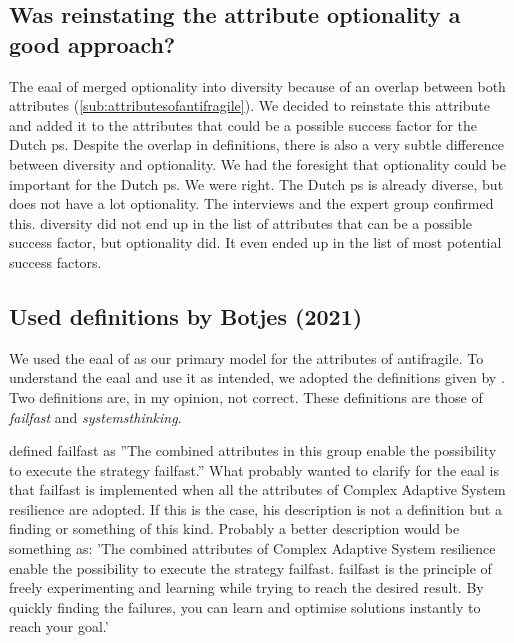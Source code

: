 \subsection{Was reinstating the attribute optionality a good approach?}
\label{sub:reinstating optionality}
The \acrlong{eaal} of \textcite{Botjes2021} merged \gls{optionality} into \gls{diversity} because of an overlap between both \glspl{attribute} (\cref{sub:attributesofantifragile}). We decided to reinstate this attribute and added it to the attributes that could be a possible success factor for the Dutch \gls{ps}. Despite the overlap in definitions, there is also a very subtle difference between \gls{diversity} and \gls{optionality}. We had the foresight that \gls{optionality} could be important for the Dutch \gls{ps}. We were right. The Dutch \gls{ps} is already diverse, but does not have a lot optionality. The interviews and the expert group confirmed this. \Gls{diversity} did not end up in the list of \glspl{attribute} that can be a possible success factor, but \gls{optionality} did. It even ended up in the list of most potential success factors.

\subsection{Used definitions by Botjes (2021)}
\label{sub:systemsthinkingdiscussion}
We used the \acrlong{eaal} of \textcite{Botjes2021} as our primary model for the \glspl{attribute} of \gls{antifragile}. To understand the \acrlong{eaal} and use it as intended, we adopted the definitions given by \textcite{Botjes2021}. Two definitions are, in my opinion, not correct. These definitions are those of \textit{\gls{failfast}} and \textit{\gls{systemsthinking}}.

\Textcite[p.~10]{Botjes2021} defined \gls{failfast} as ''The combined attributes in this group enable the possibility to execute the strategy \gls{failfast}.'' What \textcite{Botjes2021} probably wanted to clarify for the \acrlong{eaal} is that \gls{failfast} is implemented when all the \glspl{attribute} of Complex Adaptive System resilience are adopted. If this is the case, his description is not a definition but a finding or something of this kind. Probably a better description would be something as: 'The combined attributes of Complex Adaptive System resilience enable the possibility to execute the strategy \gls{failfast}. \Gls{failfast} is the principle of freely experimenting and learning while trying to reach the desired result. By quickly finding the failures, you can learn and optimise solutions instantly to reach your goal.'


